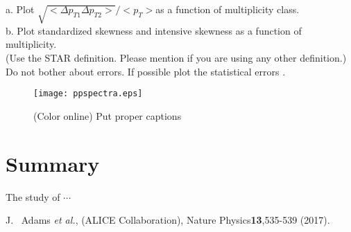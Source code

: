 \documentclass[letterpaper,aps,prc,superscriptaddress,nofootinbib,showpacs,floatfix]{revtex4-1}%
\begin{document}
a.  Plot $ \sqrt{ <\Delta p_{T1} \Delta p_{T2}>} / <p_{T}> $as a function of multiplicity class. \\

b.  Plot standardized skewness and intensive skewness as a function of multiplicity.\\

(Use the STAR definition. Please mention if you are using any other definition.)\\

Do not bother about errors. If possible plot the statistical errors .\\


\newpage
\begin{figure*}
\begin{center}
\texttt{[image: ppspectra.eps]}
\caption{(Color online) Put proper captions}
\label{f1}
\end{center}
\end{figure*}



\section{Summary}

The study of  $\cdots$


\begin{thebibliography}{50}
\medskip


  
 J. ~Adams {\it et al.}, (ALICE Collaboration), Nature Physics{\bf 13},535-539 (2017). 


\end{thebibliography}
\end{document}
